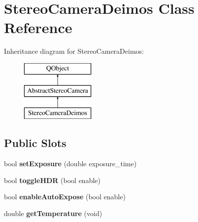 \hypertarget{class_stereo_camera_deimos}{}\section{Stereo\+Camera\+Deimos Class Reference}
\label{class_stereo_camera_deimos}
Inheritance diagram for Stereo\+Camera\+Deimos\+:\begin{figure}[H]
\begin{center}
\leavevmode
\includegraphics[height=3.000000cm]{class_stereo_camera_deimos}
\end{center}
\end{figure}
\subsection*{Public Slots}
\begin{DoxyCompactItemize}
\item 
\hypertarget{class_stereo_camera_deimos_a2033de5e607f874b8c5e78b79d17e16e}{}bool {\bfseries set\+Exposure} (double exposure\+\_\+time)\label{class_stereo_camera_deimos_a2033de5e607f874b8c5e78b79d17e16e}

\item 
\hypertarget{class_stereo_camera_deimos_a755406c93b4ffd2ef58a4fc61d7c3ffd}{}bool {\bfseries toggle\+H\+D\+R} (bool enable)\label{class_stereo_camera_deimos_a755406c93b4ffd2ef58a4fc61d7c3ffd}

\item 
\hypertarget{class_stereo_camera_deimos_aa29a36f98a63e0550f25c8f8b871fee0}{}bool {\bfseries enable\+Auto\+Expose} (bool enable)\label{class_stereo_camera_deimos_aa29a36f98a63e0550f25c8f8b871fee0}

\item 
\hypertarget{class_stereo_camera_deimos_a1eb7eb2521979e1e0d3d899aafd679d4}{}double {\bfseries get\+Temperature} (void)\label{class_stereo_camera_deimos_a1eb7eb2521979e1e0d3d899aafd679d4}

\end{DoxyCompactItemize}
